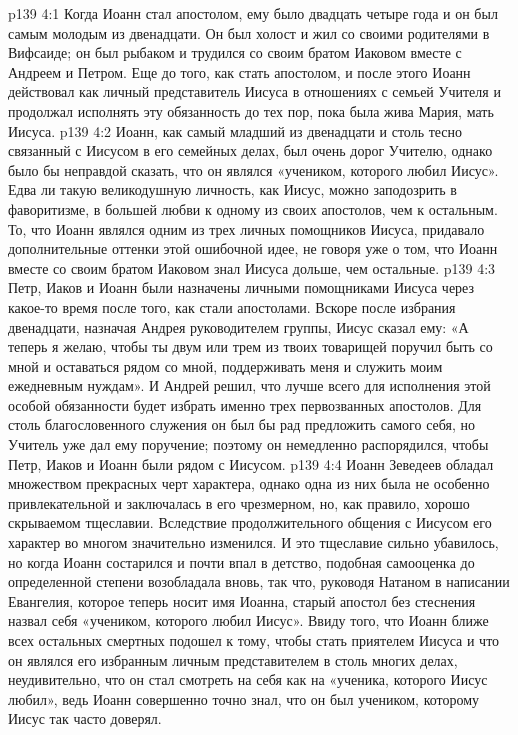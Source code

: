 \vs p139 4:1 Когда Иоанн стал апостолом, ему было двадцать четыре года и он был самым молодым из двенадцати. Он был холост и жил со своими родителями в Вифсаиде; он был рыбаком и трудился со своим братом Иаковом вместе с Андреем и Петром. Еще до того, как стать апостолом, и после этого Иоанн действовал как личный представитель Иисуса в отношениях с семьей Учителя и продолжал исполнять эту обязанность до тех пор, пока была жива Мария, мать Иисуса.
\vs p139 4:2 Иоанн, как самый младший из двенадцати и столь тесно связанный с Иисусом в его семейных делах, был очень дорог Учителю, однако было бы неправдой сказать, что он являлся «учеником, которого любил Иисус». Едва ли такую великодушную личность, как Иисус, можно заподозрить в фаворитизме, в большей любви к одному из своих апостолов, чем к остальным. То, что Иоанн являлся одним из трех личных помощников Иисуса, придавало дополнительные оттенки этой ошибочной идее, не говоря уже о том, что Иоанн вместе со своим братом Иаковом знал Иисуса дольше, чем остальные.
\vs p139 4:3 \pc Петр, Иаков и Иоанн были назначены личными помощниками Иисуса через какое\hyp{}то время после того, как стали апостолами. Вскоре после избрания двенадцати, назначая Андрея руководителем группы, Иисус сказал ему: «А теперь я желаю, чтобы ты двум или трем из твоих товарищей поручил быть со мной и оставаться рядом со мной, поддерживать меня и служить моим ежедневным нуждам». И Андрей решил, что лучше всего для исполнения этой особой обязанности будет избрать именно трех первозванных апостолов. Для столь благословенного служения он был бы рад предложить самого себя, но Учитель уже дал ему поручение; поэтому он немедленно распорядился, чтобы Петр, Иаков и Иоанн были рядом с Иисусом.
\vs p139 4:4 \pc Иоанн Зеведеев обладал множеством прекрасных черт характера, однако одна из них была не особенно привлекательной и заключалась в его чрезмерном, но, как правило, хорошо скрываемом тщеславии. Вследствие продолжительного общения с Иисусом его характер во многом значительно изменился. И это тщеславие сильно убавилось, но когда Иоанн состарился и почти впал в детство, подобная самооценка до определенной степени возобладала вновь, так что, руководя Натаном в написании Евангелия, которое теперь носит имя Иоанна, старый апостол без стеснения назвал себя «учеником, которого любил Иисус». Ввиду того, что Иоанн ближе всех остальных смертных подошел к тому, чтобы стать приятелем Иисуса и что он являлся его избранным личным представителем в столь многих делах, неудивительно, что он стал смотреть на себя как на «ученика, которого Иисус любил», ведь Иоанн совершенно точно знал, что он был учеником, которому Иисус так часто доверял.
